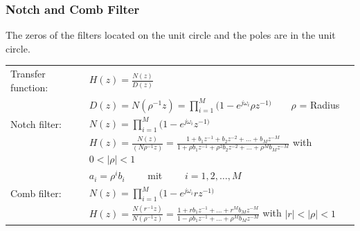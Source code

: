 \subsubsection{Notch and Comb Filter}
The zeros of the filters located on the unit circle and the poles are in the unit
circle.

\begin{tabular}{l l}
	Transfer function: & $H(z) = \frac{N(z)}{D(z)} $
	\\
  & $D(z) = N(\rho^{-1}z)  = \prod\limits_{i=1}^{M}(1- e^{j\omega_i}\rho z^{-1)} \qquad \rho$ = Radius	\\
  
  Notch filter:	
	& $N(z) = \prod\limits_{i=1}^{M}(1- e^{j\omega_i}z^{-1)} $ \\
	& $H(z) = \frac{N(z)}{(N\rho^{-1}z)}= \frac{1+b_1 z^{-1} + b_2z^{-2} + \ldots + b_M z^{-M}}
	{1+\rho b_1 z^{-1} + \rho^2 b_2z^{-2} + \ldots + \rho^M b_M z^{-M}} $ \qquad with $0 < |\rho| < 1$\\
	&$a_i=\rho^ib_i \qquad$ mit $\qquad i=1,2,\ldots,M$ \\
	
	Comb filter:
	& $N(z) = \prod\limits_{i=1}^{M}(1- e^{j\omega_i}rz^{-1)} $ \\
	& $H(z) = \frac{N(r^{-1}z)}{N(\rho^{-1}z)} 
	= \frac{1+rb_1z^{-1}+\ldots+r^Mb_Mz^{-M}}{1-\rho b_1z^{-1}+\ldots+\rho^Mb_Mz^{-M}}$ \qquad with $|r| < |\rho| < 1$ 
	\end{tabular}
	
